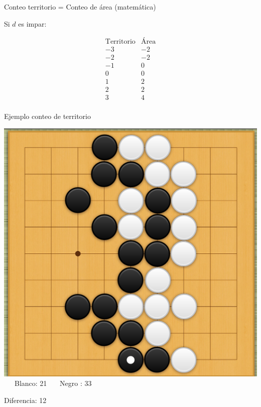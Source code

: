\documentclass{beamer}
\begin{document}
\begin{frame}{Conteo territorio = Conteo de área (matemática)}

Si $d$ es impar:
  
  $$\begin{array}{cc}
      \mbox{Territorio} & \mbox{Área} \\
      -3 & -2 \\
      -2 & -2 \\
      -1 & 0 \\
      0 & 0 \\
      1 & 2 \\
      2 & 2 \\
      3 & 4 \\
  \end{array}$$  
  
\end{frame}

\begin{frame}{Ejemplo conteo de territorio}
  
    \includegraphics[scale=0.17]{ejemplo-conteo-negroult.png} \ \ \ Blanco: 21 \ \ \ Negro : 33  
  
  Diferencia: 12
  
\end{frame}
\end{document}
